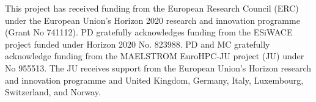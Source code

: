 \documentclass[hess, twostagejnl]{copernicus}
\begin{document}











\begin{acknowledgements}
This project has received funding from the European Research Council (ERC) under the European Union’s Horizon 2020 research and innovation programme (Grant No 741112). PD gratefully acknowledges funding from the ESiWACE project funded under Horizon 2020 No. 823988. PD and MC gratefully acknowledge funding from the MAELSTROM EuroHPC-JU project (JU) under No 955513. The JU receives support from the European Union’s Horizon research and innovation programme and United Kingdom, Germany, Italy, Luxembourg, Switzerland, and Norway.

\end{acknowledgements}





\end{document}

